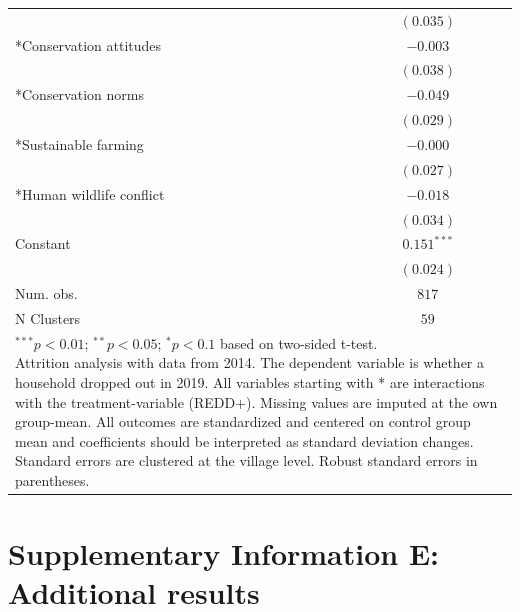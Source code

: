 \documentclass[
]{article}
\begin{document}
\begin{table}[h!]
\begin{center}
\begin{tabular}{l c}
                                   & $(0.035)$      \\
*Conservation attitudes            & $-0.003$       \\
                                   & $(0.038)$      \\
*Conservation norms                & $-0.049$       \\
                                   & $(0.029)$      \\
*Sustainable farming               & $-0.000$       \\
                                   & $(0.027)$      \\
*Human wildlife conflict           & $-0.018$       \\
                                   & $(0.034)$      \\
Constant                           & $0.151^{***}$  \\
                                   & $(0.024)$      \\
\hline
Num. obs.                          & $817$          \\
N Clusters                         & $59$           \\
\hline
\multicolumn{2}{l}{\scriptsize{\parbox{.5\linewidth}{\vspace{2pt}$^{***}p<0.01$; $^{**}p<0.05$; $^{*}p<0.1$ based on two-sided t-test.\\ Attrition analysis with data from 2014. The dependent variable is whether a household dropped out in 2019. All variables starting with * are interactions with the treatment-variable (REDD+). Missing values are imputed at the own group-mean. All outcomes are standardized and centered on control group mean and coefficients should be interpreted as standard deviation changes. Standard errors are clustered at the village level. Robust standard errors in parentheses.}}}
\end{tabular}
\label{table:coefficients}
\end{center}
\end{table}

\setcounter{table}{0}  
\renewcommand{\thetable}{E\arabic{table}}
\setcounter{figure}{0} 
\renewcommand{\thefigure}{E\arabic{figure}}

\clearpage

\hypertarget{supplementary-information-e-additional-results}{%
\section*{Supplementary Information E: Additional
results}\label{supplementary-information-e-additional-results}}
\end{document}
